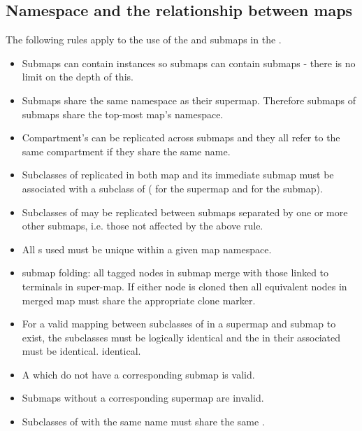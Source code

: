 \subsection{Namespace and the relationship between maps}

The following rules apply to the use of the  and
submaps in the \PDl{}. 


\begin{itemize}
\item Submaps can contain  instances so submaps
  can contain submaps - there is no limit on the depth of this.
\item Submaps share the same namespace as their supermap. Therefore submaps of
  submaps share the top-most map's namespace.
\item Compartment's can be replicated across submaps and they all
  refer to the same compartment if they share the same name.
\item Subclasses of  replicated in both map
  and its immediate submap must be
  associated with a subclass of 
  ( for the supermap and  for
 the submap).
\item Subclasses of  may be replicated
  between submaps separated by one or more other submaps, i.e. those
  not affected by the above rule.
\item All s used must be unique within a given
  map namespace.
\item submap folding: all tagged nodes in submap merge with those
  linked to terminals in super-map. If either node is cloned then all
  equivalent nodes in merged map must share the appropriate clone
  marker.
\item For a valid mapping between subclasses of  in a supermap and submap to
  exist, the  subclasses must be logically
  identical and the  in their associated  must be identical.
  identical.
\item A  which do not have a corresponding
  submap is valid.
\item Submaps without a corresponding supermap are invalid.
\item Subclasses of  with the same name must
  share the same .
\end{itemize}

